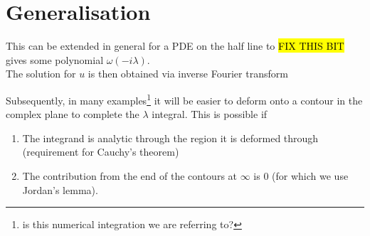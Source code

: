 \documentclass{article}
\begin{document}
\section{Generalisation}
This can be extended in general for a PDE on the half line
to \hl{FIX THIS BIT}
gives some polynomial $\omega(-i\lambda)$. \\
The solution for $u$ is then obtained via inverse Fourier transform 

Subsequently, in many examples\footnote{is this numerical integration we are referring to?} it will be easier to deform onto a contour in the complex plane to complete the $\lambda$ integral. This is possible if 
\begin{enumerate}
    \item The integrand is analytic through the region it is deformed through (requirement for Cauchy's theorem)
    \item The contribution from the end of the contours at $\infty$ is 0 (for which we use Jordan's lemma). 
\end{enumerate}
\end{document}
